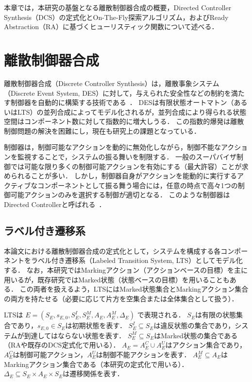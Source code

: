 \documentclass[a4paper,11pt,oneside,openany,report,dvipdfmx]{jsbook}
\begin{document}
本章では，本研究の基盤となる離散制御器合成の概要，Directed Controller Synthesis（DCS）の定式化とOn-The-Fly探索アルゴリズム，およびReady Abstraction（RA）に基づくヒューリスティック関数について述べる．

\section{離散制御器合成}

離散制御器合成（Discrete Controller Synthesis）は，離散事象システム（Discrete Event System, DES）に対して，与えられた安全性などの制約を満たす制御器を自動的に構築する技術である~\cite{DiscreteControllerSynthesis}．
DESは有限状態オートマトン（あるいはLTS）の並列合成によってモデル化されるが，並列合成により得られる状態空間はコンポーネント数に対して指数的に増大しうる．
この指数的爆発は離散制御問題の解決を困難にし，現在も研究上の課題となっている．

制御器は，制御可能なアクションを動的に無効化しながら，制御不能なアクションを監視することで，システムの振る舞いを制限する．
一般のスーパバイザ制御では可能な限り多くの制御可能アクションを有効にする（最大許容）ことが求められることが多い．
しかし，制御器自身がアクションを能動的に実行するアクティブなコンポーネントとして振る舞う場合には，任意の時点で高々1つの制御可能アクションのみを選択する制御が適切となる．
このような制御器はDirected Controllerと呼ばれる~\cite{DirectedController}．

\subsection{ラベル付き遷移系}

本論文における離散制御器合成の定式化として，システムを構成する各コンポーネントをラベル付き遷移系（Labeled Transition System, LTS）としてモデル化する．
なお，本研究ではMarkingアクション（アクションベースの目標）を主に用いるが，既存研究ではMarked状態（状態ベースの目標）を用いることもある．
この両者を扱えるよう，LTSにはMarked状態集合とMarkingアクション集合の両方を持たせる（必要に応じて片方を空集合または全体集合として扱う）．

\begin{definition}[LTS]
  LTSは
  $E = (S_E, s_{E,0}, S^I_E, S^M_E, A_E, A^M_E, \Delta_E)$
  で表現される．
  $S_E$は有限の状態集合であり，$s_{E,0} \in S_E$は初期状態を表す．
  $S^I_E \subseteq S_E$は違反状態の集合であり，システムが到達してはならない状態を表す．
  $S^M_E \subseteq S_E$はMarked状態の集合である（RAや既存のDCS定式化で用いる）．
  $A_E = A^C_E \cup A^U_E$はアクション集合であり，$A^C_E$は制御可能アクション，$A^U_E$は制御不能アクションを表す．
  $A^M_E \subseteq A_E$はMarkingアクション集合である（本研究の定式化で用いる）．
  $\Delta_E \subseteq S_E \times A_E \times S_E$は遷移関係を表す．
\end{definition}
\end{document}
